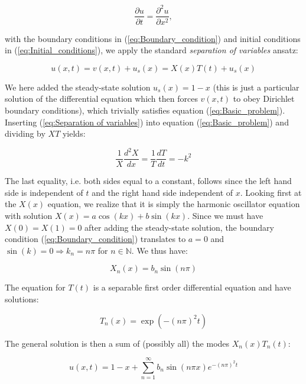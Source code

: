 \documentclass[a4paper, 11pt, notitlepage,english]{article}
\begin{document}
\begin{equation}
\frac{\partial u}{\partial t} = \frac{\partial^2 u}{\partial x^2},
\label{eq:Basic_problem}
\end{equation}

with the boundary conditions in (\ref{eq:Boundary_condition}) and initial conditions in (\ref{eq:Initial_conditions}), we apply the standard \emph{separation of variables} ansatz:

\begin{equation}
 u(x,t) = v(x,t) + u_s(x) = X(x)T(t) + u_s(x)
\label{eq:Separation of variables}
\end{equation}

We here added the steady-state solution $u_s(x) = 1-x$ (this is just a particular solution of the differential equation which then forces $v(x,t)$ to obey Dirichlet boundary 
conditions), which trivially satisfies equation (\ref{eq:Basic_problem}). Inserting (\ref{eq:Separation of variables}) into equation (\ref{eq:Basic_problem})
and dividing by $XT$ yields:

\begin{equation}
\frac{1}{X} \frac{d^2 X}{dx} = \frac{1}{T}\frac{dT}{dt} = -k^2
\label{eq:Separated_equation}
\end{equation}

The last equality, i.e. both sides equal to a constant, follows since the left hand side is independent of $t$ and the right hand side independent of $x$. 
Looking first at the $X(x)$ equation, we realize that it is simply the harmonic oscillator equation with solution $X(x) = a\cos(kx) + b\sin(kx)$. 
Since we must have $X(0) = X(1) = 0$ after adding the steady-state solution, the boundary condition (\ref{eq:Boundary_condition}) translates to
$a = 0$ and  $\sin(k) = 0 \Rightarrow k_n = n\pi$ for $n \in \mathbb{N}$. We thus have:

\begin{equation}
X_n(x) = b_n \sin(n\pi)
\label{eq:Separated_X_solution}
\end{equation}

The equation for $T(t)$ is a separable first order differential equation and have solutions:

\begin{equation}
T_n(x) = \exp(-(n\pi)^2t)
\label{eq:Separated_T_solution}
\end{equation}

The general solution is then a sum of (possibly all) the modes $X_n(x)T_n(t)$:

\begin{equation}
u(x,t) = 1-x +\sum_{n=1}^{\infty} b_n \sin(n\pi x) e^{-(n\pi)^2t}
\label{eq:General_solution}
\end{equation}
\end{document}
